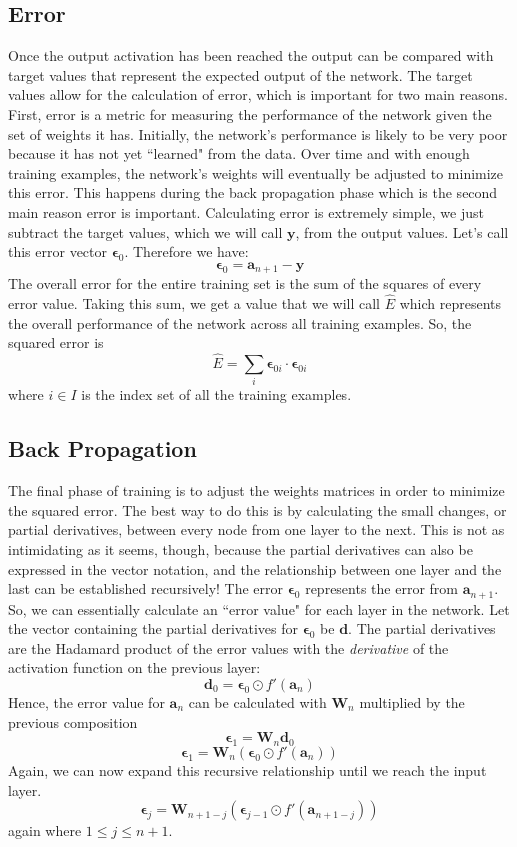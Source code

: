\documentclass[12pt]{report}
\begin{document}
\subsection{Error}
Once the output activation has been reached the output can be compared with target values that represent the expected output of the network. The target values allow for the calculation of error, which is important for two main reasons. First, error is a metric for measuring the performance of the network given the set of weights it has. Initially, the network's performance is likely to be very poor because it has not yet ``learned" from the data. Over time and with enough training examples, the network's weights will eventually be adjusted to minimize this error. This happens during the back propagation phase which is the second main reason error is important. Calculating error is extremely simple, we just subtract the target values, which we will call $\textbf{y}$, from the output values. Let's call this error vector $\boldsymbol{\epsilon}_0$.
Therefore we have:
$$\boldsymbol{\epsilon}_0 = \textbf{a}_{n+1} - \textbf{y}$$
The overall error for the entire training set is the sum of the squares of every error value. Taking this sum, we get a value that we will call $\hat{E}$ which represents the overall performance of the network across all training examples. So, the squared error is
$$\hat{E} = \sum_i \boldsymbol{\epsilon}_{0i} \cdot \boldsymbol{\epsilon}_{0i}$$
where $i \in I$ is the index set of all the training examples.

\subsection{Back Propagation}
The final phase of training is to adjust the weights matrices in order to minimize the squared error. The best way to do this is by calculating the small changes, or partial derivatives, between every node from one layer to the next. This is not as intimidating as it seems, though, because the partial derivatives can also be expressed in the vector notation, and the relationship between one layer and the last can be established recursively! The error $\boldsymbol{\epsilon}_0$ represents the error from $\textbf{a}_{n+1}$. So, we can essentially calculate an ``error value" for each layer in the network. Let the vector containing the partial derivatives for $\boldsymbol{\epsilon}_0$ be $\textbf{d}$. The partial derivatives are the Hadamard product of the error values with the \emph{derivative} of the activation function on the previous layer:
$$\textbf{d}_0 = \boldsymbol{\epsilon}_0 \odot f'(\textbf{a}_n)$$
Hence, the error value for $\textbf{a}_n$ can be calculated with $\textbf{W}_n$ multiplied by the previous composition
$$\boldsymbol{\epsilon}_1 = \textbf{W}_n \textbf{d}_0$$
$$\boldsymbol{\epsilon}_1 = \textbf{W}_n (\boldsymbol{\epsilon}_0 \odot f'(\textbf{a}_n))$$
Again, we can now expand this recursive relationship until we reach the input layer.
$$\boldsymbol{\epsilon}_j = \textbf{W}_{n+1-j} (\boldsymbol{\epsilon}_{j-1} \odot f'(\textbf{a}_{n+1-j}))$$
again where $1 \leq j \leq n+1$.
\end{document}

